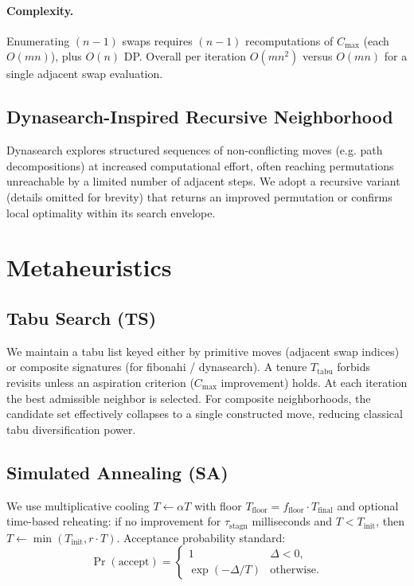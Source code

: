 \documentclass[runningheads]{llncs}
\begin{document}
\paragraph{Complexity.} Enumerating $(n{-}1)$ swaps requires $(n{-}1)$ recomputations of $C_{\max}$ (each $O(mn)$), plus $O(n)$ DP. Overall per iteration $O(m n^2)$ versus $O(m n)$ for a single adjacent swap evaluation.

\subsection{Dynasearch-Inspired Recursive Neighborhood}
Dynasearch explores structured sequences of non-conflicting moves (e.g. path decompositions) at increased computational effort, often reaching permutations unreachable by a limited number of adjacent steps. We adopt a recursive variant (details omitted for brevity) that returns an improved permutation or confirms local optimality within its search envelope.

\section{Metaheuristics}
\subsection{Tabu Search (TS)}
We maintain a tabu list keyed either by primitive moves (adjacent swap indices) or composite signatures (for fibonahi / dynasearch). A tenure $T_{\text{tabu}}$ forbids revisits unless an aspiration criterion ($C_{\max}$ improvement) holds. At each iteration the best admissible neighbor is selected. For composite neighborhoods, the candidate set effectively collapses to a single constructed move, reducing classical tabu diversification power.

\subsection{Simulated Annealing (SA)}
We use multiplicative cooling $T \leftarrow \alpha T$ with floor $T_{\text{floor}} = f_{\text{floor}} \cdot T_{\text{final}}$ and optional time-based reheating: if no improvement for $\tau_{\text{stagn}}$ milliseconds and $T < T_{\text{init}}$, then $T \leftarrow \min(T_{\text{init}}, r \cdot T)$. Acceptance probability standard:
\[
\Pr(\text{accept}) =
\begin{cases}
1 & \Delta < 0,\\
\exp(-\Delta/T) & \text{otherwise}.
\end{cases}
\]
\end{document}
